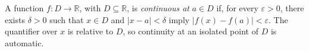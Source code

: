 
A function $f:D\to\mathbb R$, with $D\subseteq\mathbb R$, is \emph{continuous at} $a\in D$ if, for every $\varepsilon>0$, there exists $\delta>0$ such that $x\in D$ and $|x-a|<\delta$ imply $|f(x)-f(a)|<\varepsilon$. The quantifier over $x$ is relative to $D$, so continuity at an isolated point of $D$ is automatic.
